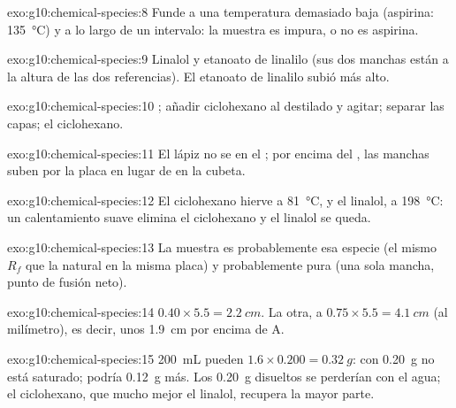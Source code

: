 \begin{solution}{exo:g10:chemical-species:8}
Funde a una temperatura demasiado baja (aspirina: \qty{135}{\celsius}) y
a lo largo de un intervalo: la muestra es impura, o no es aspirina.
\end{solution}

\begin{solution}{exo:g10:chemical-species:9}
Linalol y etanoato de linalilo (sus dos manchas están a la altura de las
dos referencias). El etanoato de linalilo subió más alto.
\end{solution}

\begin{solution}{exo:g10:chemical-species:10}
; añadir ciclohexano al destilado y agitar; separar las
capas;  el ciclohexano.
\end{solution}

\begin{solution}{exo:g10:chemical-species:11}
El lápiz no se  en el ; por encima del , las
manchas suben por la placa en lugar de  en la cubeta.
\end{solution}

\begin{solution}{exo:g10:chemical-species:12}
El ciclohexano hierve a \qty{81}{\celsius}, y el linalol, a
\qty{198}{\celsius}: un calentamiento suave elimina el ciclohexano y el
linalol se queda.
\end{solution}

\begin{solution}{exo:g10:chemical-species:13}
La muestra es probablemente esa especie (el mismo $R_f$ que la natural
en la misma placa) y probablemente pura (una sola mancha, punto de
fusión neto).
\end{solution}

\begin{solution}{exo:g10:chemical-species:14}
$0.40 \times 5.5 = \qty{2.2}{cm}$. La otra, a $0.75 \times 5.5 =
\qty{4.1}{cm}$ (al milímetro), es decir, unos \qty{1.9}{cm} por encima
de A.
\end{solution}

\begin{solution}{exo:g10:chemical-species:15}
\qty{200}{mL} pueden  $1.6 \times 0.200 = \qty{0.32}{g}$: con
\qty{0.20}{g} no está saturado; podría  \qty{0.12}{g} más. Los
\qty{0.20}{g} disueltos se perderían con el agua; el ciclohexano, que
 mucho mejor el linalol, recupera la mayor parte.
\end{solution}

